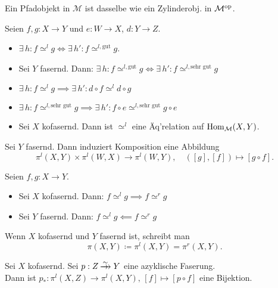 \documentclass{cheat-sheet}
\newcommand{\nspace}[1]{\foreach \i in {1,...,#1}{ \! }} %
\newcommand{\xtwoheadrightarrow}[1]{\xrightarrow{#1}\nspace{8}\to\,\,} %
\newcommand{\ModC}{\mathcal{M}} %
\newcommand{\gut}{\text{gut}}
\newcommand{\sg}{\text{sehr gut}}
\begin{document}
\begin{bem}
  Ein Pfadobjekt in $\ModC$ ist dasselbe wie ein Zylinderobj. in $\ModC^\op$.
\end{bem}


\begin{lem}
  Seien $f, g : X \to Y$ und $e : W \to X$, $d : Y \to Z$.
  \begin{itemize}
    \item $\exists \, h : f \simeq^l g \iff \exists \, h' : f \simeq^{l,\gut} g$.
    \item Sei $Y$ fasernd. Dann: $\exists \, h : f \simeq^{l,\gut} g \iff \exists \, h' : f \simeq^{l,\sg} g$
    \item $\exists \, h : f \simeq^l g \implies \exists \, h' : d \circ f \simeq^l d \circ g$
    \item $\exists \, h : f \simeq^{l,\sg} g \implies \exists \, h' : f \circ e \simeq^{l,\sg} g \circ e$
    \item Sei $X$ kofasernd. Dann ist $\simeq^l$ eine Äq'relation auf $\Hom_\ModC(X, Y)$.
  \end{itemize}
\end{lem}

\begin{kor}
  Sei $Y$ fasernd. Dann induziert Komposition eine Abbildung
  \[
    \pi^l(X, Y) \times \pi^l(W, X) \to \pi^l(W, Y), \quad
    ([g], [f]) \mapsto [g \circ f].
  \]
\end{kor}

\begin{prop}
  Seien $f, g : X \to Y$.
  \begin{itemize}
    \item Sei $X$ kofasernd. Dann: $f \simeq^l g \implies f \simeq^r g$
    \item Sei $Y$ fasernd.\phantom{ko} Dann: $f \simeq^l g \impliedby f \simeq^r g$
  \end{itemize}
\end{prop}

\begin{nota}
  Wenn $X$ kofasernd und $Y$ fasernd ist, schreibt man
  \[ \pi(X, Y) \coloneqq \pi^l(X, Y) = \pi^r(X, Y). \]
\end{nota}

\begin{thm}
  Sei $X$ kofasernd. Sei $p : Z \xtwoheadrightarrow{\sim} Y$ eine azyklische Faserung. \\
  Dann ist $p_* : \pi^l(X, Z) \to \pi^l(X, Y), \, [f] \mapsto [p \circ f]$ eine Bijektion.
\end{thm}
\end{document}
